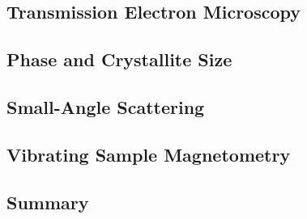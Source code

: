 \documentclass[\main/dresen_thesis.tex]{subfiles}
\renewcommand{\thisPath}{\main/chapters/colloidalCrystals/nanoparticles/}
\begin{document}
  \subsection{Transmission Electron Microscopy}
    
      \FloatBarrier

  \subsection{Phase and Crystallite Size}
    
      \FloatBarrier

  \subsection{Small-Angle Scattering}
    
      \FloatBarrier

  \subsection{Vibrating Sample Magnetometry}
    
      \FloatBarrier

  \clearpage
  \subsection{Summary}
  
    \FloatBarrier
\end{document}
